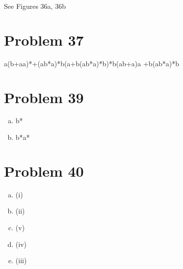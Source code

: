 \documentclass[11pt]{article}
\begin{document}
See Figures 36a, 36b

\section*{Problem 37}

a(b+aa)*+(ab*a)*b(a+b(ab*a)*b)*b(ab+a)a +b(ab*a)*b

\section*{Problem 39}

\begin{enumerate}[(a)]
	\item b*
	\item b*a*
	
\end{enumerate}

\section*{Problem 40}

\begin{enumerate}[(a)]
	\item (i)
	\item (ii)
	\item (v)
	\item (iv)
	\item (iii)
	
\end{enumerate}
\end{document}
